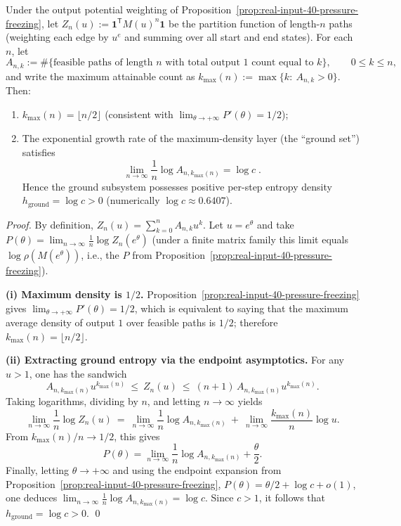 \begin{corollary}[Zero-temperature limit yields positive ground entropy: \texorpdfstring{$h_{\mathrm{ground}}=\log c>0$}{h_ground=log c>0}]\label{cor:real-input-40-ground-entropy}
Under the output potential weighting of Proposition~\ref{prop:real-input-40-pressure-freezing}, let
\(
Z_n(u):=\mathbf{1}^{\mathsf T}M(u)^n\mathbf{1}
\)
be the partition function of length-\(n\) paths (weighting each edge by \(u^{e}\) and summing over all start and end states).
For each \(n\), let
\[
A_{n,k}:=\#\{\text{feasible paths of length }n\text{ with total output }1\text{ count equal to }k\},
\qquad 0\le k\le n,
\]
and write the maximum attainable count as
\(
k_{\max}(n):=\max\{k:\ A_{n,k}>0\}.
\)
Then:
\begin{enumerate}
  \item \(k_{\max}(n)=\lfloor n/2\rfloor\) (consistent with \(\lim_{\theta\to+\infty}P'(\theta)=1/2\));
  \item The exponential growth rate of the maximum-density layer (the ``ground set'') satisfies
  \[
  \boxed{\;
  \lim_{n\to\infty}\frac{1}{n}\log A_{n,k_{\max}(n)}=\log c\; }.
  \]
  Hence the ground subsystem possesses positive per-step entropy density \(h_{\mathrm{ground}}=\log c>0\) (numerically \(\log c\approx 0.6407\)).
\end{enumerate}
\end{corollary}
\begin{proof}
By definition, \(Z_n(u)=\sum_{k=0}^{n}A_{n,k}u^{k}\).
Let \(u=e^\theta\) and take \(P(\theta)=\lim_{n\to\infty}\frac{1}{n}\log Z_n(e^\theta)\) (under a finite matrix family this limit equals \(\log\rho(M(e^\theta))\), i.e., the \(P\) from Proposition~\ref{prop:real-input-40-pressure-freezing}).

\textbf{(i) Maximum density is \(1/2\).}
Proposition~\ref{prop:real-input-40-pressure-freezing} gives \(\lim_{\theta\to+\infty}P'(\theta)=1/2\), which is equivalent to saying that the maximum average density of output \(1\) over feasible paths is \(1/2\); therefore \(k_{\max}(n)=\lfloor n/2\rfloor\).

\textbf{(ii) Extracting ground entropy via the endpoint asymptotics.}
For any \(u>1\), one has the sandwich
\[
A_{n,k_{\max}(n)}u^{k_{\max}(n)}
\ \le\
Z_n(u)
\ \le\
(n+1)\,A_{n,k_{\max}(n)}u^{k_{\max}(n)}.
\]
Taking logarithms, dividing by \(n\), and letting \(n\to\infty\) yields
\[
\lim_{n\to\infty}\frac{1}{n}\log Z_n(u)
\ =\
\lim_{n\to\infty}\frac{1}{n}\log A_{n,k_{\max}(n)}
\ +\
\lim_{n\to\infty}\frac{k_{\max}(n)}{n}\log u.
\]
From \(k_{\max}(n)/n\to 1/2\), this gives
\[
P(\theta)=\lim_{n\to\infty}\frac{1}{n}\log A_{n,k_{\max}(n)}+\frac{\theta}{2}.
\]
Finally, letting \(\theta\to+\infty\) and using the endpoint expansion from Proposition~\ref{prop:real-input-40-pressure-freezing},
\(
P(\theta)=\theta/2+\log c+o(1)
\), one deduces
\(
\lim_{n\to\infty}\frac{1}{n}\log A_{n,k_{\max}(n)}=\log c
\).
Since \(c>1\), it follows that \(h_{\mathrm{ground}}=\log c>0\). \qed
\end{proof}
